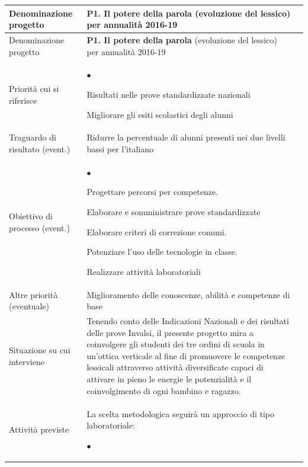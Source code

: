 \documentclass[12pt,a4paper,oneside]{memoir}
\newenvironment{elenco}{\begin{list}{$\bullet$}{%
              \setlength{\leftmargin}{4mm}%
              \setlength{\rightmargin}{1mm}%
               \setlength{\itemindent}{0mm}%
               \setlength{\labelwidth}{2mm}%
               \setlength{\labelsep}{2mm}%
              \setlength{\itemsep}{-\parsep}%
              \setlength{\partopsep}{0pt}%
              \setlength{\topsep}{0pt}%
             \setlength{\parskip}{0pt}%
              }}{\end{list}}
\begin{document}
\clearpage

\begin{footnotesize}
\begin{longtable}{|>{\raggedright}p{2.5cm}|>{\raggedright\arraybackslash}P{10cm}|}
\hline
{}
\label{P1}Denominazione progetto&\textbf{P1. Il potere della parola} (evoluzione del lessico) per annualità 2016-19\\ \hline \endfirsthead
\hline
{}
Denominazione progetto&\textbf{P1. Il potere della parola} (evoluzione del lessico) per annualità 2016-19\\ \hline \endhead
{}
\endfoot
\hline
\endlastfoot
Priorità cui si riferisce&%
\begin{elenco}%
\item Risultati nelle prove standardizzate nazionali
\item Migliorare gli esiti scolastici degli alunni
\end{elenco}%
\\[-4mm] \hline 
Traguardo di risultato (event.)&Ridurre la percentuale di alunni presenti nei due livelli bassi
per l'italiano\\ \hline 
Obiettivo di processo (event.)&\begin{elenco}%
\item Progettare percorsi per competenze.
\item Elaborare e somministrare prove standardizzate
\item  Elaborare criteri di correzione comuni.
\item Potenziare l'uso delle tecnologie in classe.
\item Realizzare attività laboratoriali
\end{elenco}\\[-4mm] \hline 
Altre priorità (eventuale)&Miglioramento delle conoscenze, abilità e competenze di base \\ \hline 
Situazione su cui interviene&Tenendo conto delle Indicazioni Nazionali e dei risultati delle prove Invalsi, il presente progetto mira a coinvolgere gli studenti dei tre ordini di scuola in un’ottica verticale al fine di promuovere le competenze lessicali attraverso attività diversificate capaci di attivare in pieno le energie le potenzialità e il coinvolgimento di ogni bambino e ragazzo.\\ \hline 
Attività previste&La scelta metodologica seguirà un approccio di tipo laboratoriale:
\begin{elenco}%

\end{elenco}
\end{longtable}
\end{footnotesize}
\end{document}
